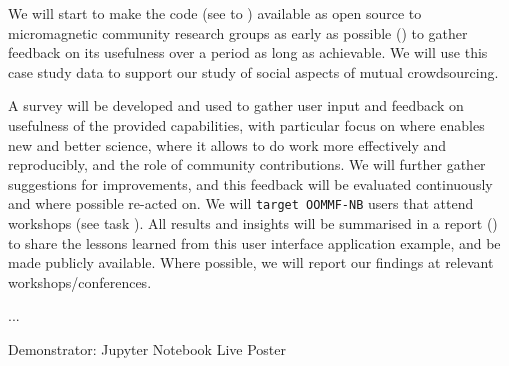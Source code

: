 \begin{workpackage}[id=social-aspects,wphases=1-48!.5,
  title=Social Aspects,
  lead=UO,
  UORM=1,USHRM=8, USORM=5]
\begin{tasklist}
\begin{task}[title=OOMMF case study: Evaluation]
  We will start to make the \OOMMFNB{} code (see
   to
  ) available as open
  source to micromagnetic community research groups as early as
  possible
  () to
  gather feedback on its usefulness over a period as long as
  achievable. We will use this case study data to support our study of
  social aspects of mutual crowdsourcing.

  A survey will be developed and used to gather user input and
  feedback on usefulness of the provided capabilities, with particular
  focus on where \OOMMFNB{} enables new and better science, where it
  allows to do work more effectively and reproducibly, and the role of
  community contributions. We will further gather suggestions for
  improvements, and this feedback will be evaluated continuously and
  where possible re-acted on. We will \texttt{target OOMMF-NB} users
  that attend workshops (see task
  ). All results
  and insights will be summarised in a report () to share the lessons
  learned from this user interface application example, and be made
  publicly available. Where possible, we will report our findings at
  relevant workshops/conferences.
\end{task}



\end{tasklist}


\begin{wpdelivs}
  \begin{wpdeliv}[due=12,id=social-...,dissem=PU,nature=??]
      {...}
\end{wpdeliv}
 \begin{wpdeliv}[due=36,id=social-poster,dissem=PU,nature=DEM]{Demonstrator: Jupyter Notebook Live Poster} \end{wpdeliv}

\end{wpdelivs}
\end{workpackage}

